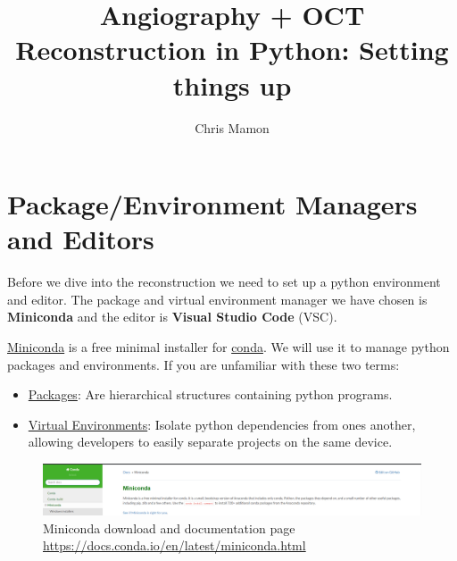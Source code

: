 \documentclass[10pt,a4paper]{article}
\author{Chris Mamon}
\title{Angiography + OCT Reconstruction in Python: Setting things up}
\date{}
\begin{document}
	\maketitle
	\section{Package/Environment Managers and Editors}
		Before we dive into the reconstruction we need to set up a python environment and editor. The package and virtual environment manager we have chosen is \textbf{Miniconda} and the editor is \textbf{Visual Studio Code} (VSC).
		
		\href{https://docs.conda.io/en/latest/miniconda.html}{Miniconda} is a free minimal installer for \href{https://www.anaconda.com/distribution/}{conda}. We will use it to manage python packages and environments. If you are unfamiliar with these two terms:
		\begin{itemize}
			\item \href{https://realpython.com/python-modules-packages/#reloading-a-module}{Packages}: Are hierarchical structures 	containing python programs.	
			\item \href{https://www.geeksforgeeks.org/python-virtual-environment/}{Virtual Environments}: Isolate python dependencies from ones another, allowing developers to easily separate projects on the same device.
		\end{itemize}
		\begin{figure}[h]
			\centering
			\includegraphics[scale=0.25]{figures/miniconda.PNG}
			\caption{Miniconda download and documentation page \url{https://docs.conda.io/en/latest/miniconda.html}}
		\end{figure}
		
\end{document}
